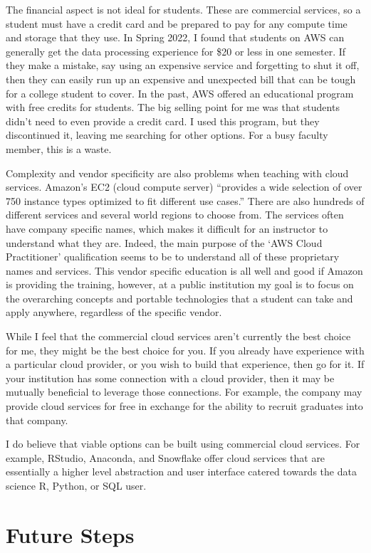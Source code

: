 \documentclass[12pt]{article}
\begin{document}
The financial aspect is not ideal for students.
These are commercial services, so a student must have a credit card and be prepared to pay for any compute time and storage that they use.
In Spring 2022, I found that students on AWS can generally get the data processing experience for \$20 or less in one semester.
If they make a mistake, say using an expensive service and forgetting to shut it off, then they can easily run up an expensive and unexpected bill that can be tough for a college student to cover.
In the past, AWS offered an educational program with free credits for students.
The big selling point for me was that students didn't need to even provide a credit card.
I used this program, but they discontinued it, leaving me searching for other options.
For a busy faculty member, this is a waste.

Complexity and vendor specificity are also problems when teaching with cloud services.
Amazon's EC2 (cloud compute server) ``provides a wide selection of over 750 instance types optimized to fit different use cases.''
There are also hundreds of different services and several world regions to choose from.
The services often have company specific names, which makes it difficult for an instructor to understand what they are.
Indeed, the main purpose of the `AWS Cloud Practitioner' qualification seems to be to understand all of these proprietary names and services.
This vendor specific education is all well and good if Amazon is providing the training, however, at a public institution my goal is to focus on the overarching concepts and portable technologies that a student can take and apply anywhere, regardless of the specific vendor.

While I feel that the commercial cloud services aren't currently the best choice for me, they might be the best choice for you.
If you already have experience with a particular cloud provider, or you wish to build that experience, then go for it.
If your institution has some connection with a cloud provider, then it may be mutually beneficial to leverage those connections.
For example, the company may provide cloud services for free in exchange for the ability to recruit graduates into that company.

I do believe that viable options can be built using commercial cloud services.
For example, RStudio, Anaconda, and Snowflake offer cloud services that are essentially a higher level abstraction and user interface catered towards the data science R, Python, or SQL user.

\section{Future Steps}
\end{document}
